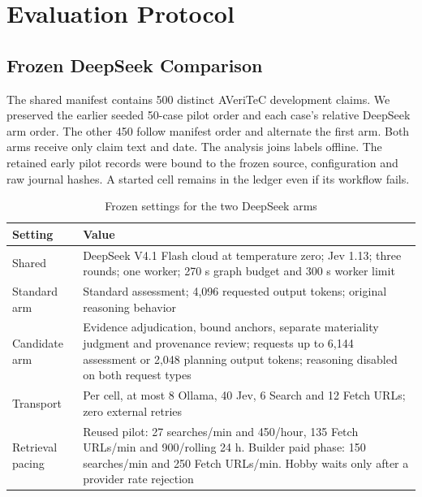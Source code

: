 \documentclass[conference]{IEEEtran}
\begin{document}
\section{Evaluation Protocol}
\subsection{Frozen DeepSeek Comparison}
The shared manifest contains 500 distinct AVeriTeC development claims. We preserved the earlier seeded 50-case pilot order and each case's relative DeepSeek arm order. The other 450 follow manifest order and alternate the first arm. Both arms receive only claim text and date. The analysis joins labels offline. The retained early pilot records were bound to the frozen source, configuration and raw journal hashes. A started cell remains in the ledger even if its workflow fails.

\begin{table}[t]
\caption{Frozen settings for the two DeepSeek arms}
\label{tab:deepseek-settings}
\centering
\footnotesize
\begin{tabular}{@{}p{}p{}@{}}
\toprule
Setting & Value\\
\midrule
Shared & DeepSeek V4.1 Flash cloud at temperature zero; Jev 1.13; three rounds; one worker; 270 s graph budget and 300 s worker limit\\
Standard arm & Standard assessment; 4,096 requested output tokens; original reasoning behavior\\
Candidate arm & Evidence adjudication, bound anchors, separate materiality judgment and provenance review; requests up to 6,144 assessment or 2,048 planning output tokens; reasoning disabled on both request types\\
Transport & Per cell, at most 8 Ollama, 40 Jev, 6 Search and 12 Fetch URLs; zero external retries\\
Retrieval pacing & Reused pilot: 27 searches/min and 450/hour, 135 Fetch URLs/min and 900/rolling 24 h. Builder paid phase: 150 searches/min and 250 Fetch URLs/min. Hobby waits only after a provider rate rejection\\
\bottomrule
\end{tabular}
\end{table}
\end{document}
